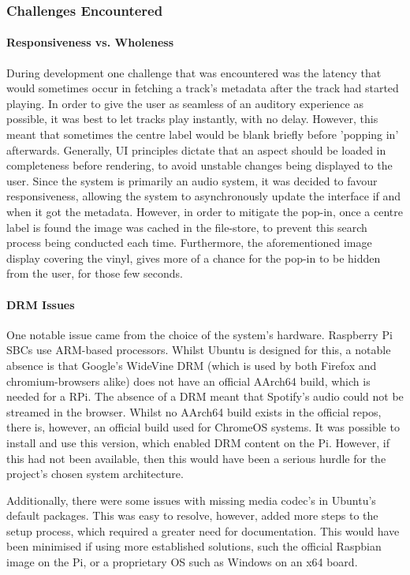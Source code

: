             \subsubsection{Challenges Encountered}
    
                \paragraph{Responsiveness vs. Wholeness} During development one challenge that was encountered was the latency that would sometimes occur in fetching a track's metadata after the track had started playing. In order to give the user as seamless of an auditory experience as possible, it was best to let tracks play instantly, with no delay. However, this meant that sometimes the centre label would be blank briefly before 'popping in' afterwards. Generally, UI principles dictate that an aspect should be loaded in completeness before rendering, to avoid unstable changes being displayed to the user. Since the system is primarily an audio system, it was decided to favour responsiveness, allowing the system to asynchronously update the interface if and when it got the metadata. However, in order to mitigate the pop-in, once a centre label is found the image was cached in the file-store, to prevent this search process being conducted each time. Furthermore, the aforementioned image display covering the vinyl, gives more of a chance for the pop-in to be hidden from the user, for those few seconds.
    
                \paragraph{DRM Issues} One notable issue came from the choice of the system's hardware. Raspberry Pi SBCs use ARM-based processors. Whilst Ubuntu is designed for this, a notable absence is that Google's WideVine DRM (which is used by both Firefox and chromium-browsers alike) does not have an official AArch64 build, which is needed for a RPi. The absence of a DRM meant that Spotify's audio could not be streamed in the browser. Whilst no AArch64 build exists in the official repos, there is, however, an official build used for ChromeOS systems. It was possible to install and use this version, which enabled DRM content on the Pi. However, if this had not been available, then this would have been a serious hurdle for the project's chosen system architecture.
    
                Additionally, there were some issues with missing media codec's in Ubuntu's default packages. This was easy to resolve, however, added more steps to the setup process, which required a greater need for documentation. This would have been minimised if using more established solutions, such the official Raspbian image on the Pi, or a proprietary OS such as Windows on an x64 board.
    
